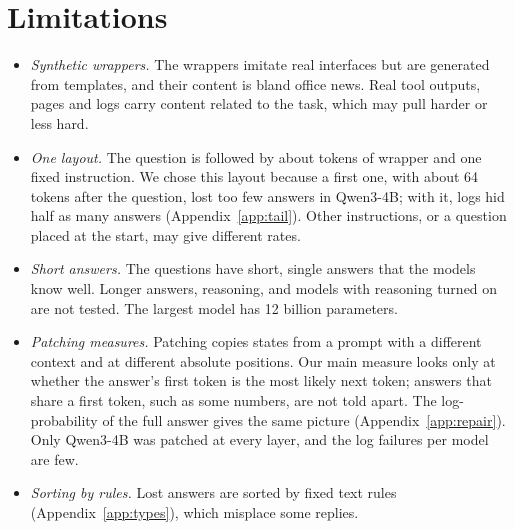 \section{Limitations}
\label{sec:limits}

\begin{itemize}
\item \emph{Synthetic wrappers.} The wrappers imitate real interfaces but are generated from templates, and their content is bland office news. Real tool outputs, pages and logs carry content related to the task, which may pull harder or less hard.
\item \emph{One layout.} The question is followed by about \TailTokens{} tokens of wrapper and one fixed instruction. We chose this layout because a first one, with about 64 tokens after the question, lost too few answers in Qwen3-4B; with it, logs hid half as many answers (Appendix~\ref{app:tail}). Other instructions, or a question placed at the start, may give different rates.
\item \emph{Short answers.} The questions have short, single answers that the models know well. Longer answers, reasoning, and models with reasoning turned on are not tested. The largest model has 12 billion parameters.
\item \emph{Patching measures.} Patching copies states from a prompt with a different context and at different absolute positions. Our main measure looks only at whether the answer's first token is the most likely next token; answers that share a first token, such as some numbers, are not told apart. The log-probability of the full answer gives the same picture (Appendix~\ref{app:repair}). Only Qwen3-4B was patched at every layer, and the log failures per model are few.
\item \emph{Sorting by rules.} Lost answers are sorted by fixed text rules (Appendix~\ref{app:types}), which misplace some replies.
\end{itemize}
